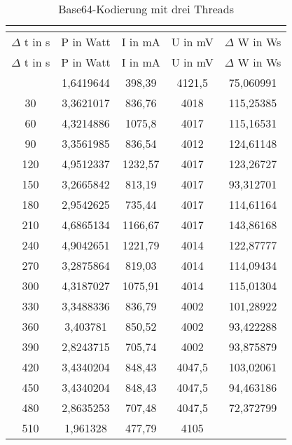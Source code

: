 \begin{longtable}[c]{ccccc}
\caption{Base64-Kodierung mit drei Threads} \\
\label{tab:Base64MessungThreadDrei}\\
\hline
{$\Delta$ t in s} & {P in Watt} & {I in mA} & {U in mV} & {$\Delta$ W in Ws} \\
\hline
\endfirsthead
\hline
$\Delta$ t in s & P in Watt & I in mA & U in mV & $\Delta$ W in Ws \\
\hline
\endhead
\hline
\endfoot
\hline
 \midrule
   \midrule
    0     & 1,6419644 & 398,39 & 4121,5 & 75,060991 \\
    \midrule
    30    & 3,3621017 & 836,76 & 4018  & 115,25385 \\
    \midrule
    60    & 4,3214886 & 1075,8 & 4017  & 115,16531 \\
    \midrule
    90    & 3,3561985 & 836,54 & 4012  & 124,61148 \\
    \midrule
    120   & 4,9512337 & 1232,57 & 4017  & 123,26727 \\
    \midrule
    150   & 3,2665842 & 813,19 & 4017  & 93,312701 \\
    \midrule
    180   & 2,9542625 & 735,44 & 4017  & 114,61164 \\
    \midrule
    210   & 4,6865134 & 1166,67 & 4017  & 143,86168 \\
    \midrule
    240   & 4,9042651 & 1221,79 & 4014  & 122,87777 \\
    \midrule
    270   & 3,2875864 & 819,03 & 4014  & 114,09434 \\
    \midrule
    300   & 4,3187027 & 1075,91 & 4014  & 115,01304 \\
    \midrule
    330   & 3,3488336 & 836,79 & 4002  & 101,28922 \\
    \midrule
    360   & 3,403781 & 850,52 & 4002  & 93,422288 \\
    \midrule
    390   & 2,8243715 & 705,74 & 4002  & 93,875879 \\
    \midrule
    420   & 3,4340204 & 848,43 & 4047,5 & 103,02061 \\
    \midrule
    450   & 3,4340204 & 848,43 & 4047,5 & 94,463186 \\
    \midrule
    480   & 2,8635253 & 707,48 & 4047,5 & 72,372799 \\
    \midrule
    510   & 1,961328 & 477,79 & 4105  &  \\
\end{longtable}
